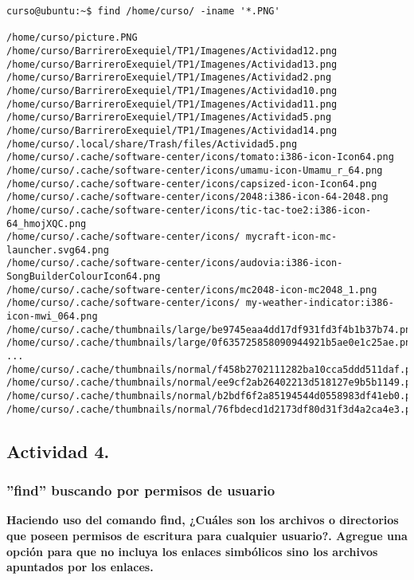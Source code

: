 \documentclass[a4paper,11pt,spanish]{article} %
\newenvironment{myscriptlisting}
{\begin{list}{}{\setlength{\leftmargin}{1em}}\item\scriptsize\bfseries}
{\end{list}}
\begin{document}
\begin{myscriptlisting}
 \begin{verbatim}
curso@ubuntu:~$ find /home/curso/ -iname '*.PNG'

/home/curso/picture.PNG
/home/curso/BarrireroExequiel/TP1/Imagenes/Actividad12.png
/home/curso/BarrireroExequiel/TP1/Imagenes/Actividad13.png
/home/curso/BarrireroExequiel/TP1/Imagenes/Actividad2.png
/home/curso/BarrireroExequiel/TP1/Imagenes/Actividad10.png
/home/curso/BarrireroExequiel/TP1/Imagenes/Actividad11.png
/home/curso/BarrireroExequiel/TP1/Imagenes/Actividad5.png
/home/curso/BarrireroExequiel/TP1/Imagenes/Actividad14.png
/home/curso/.local/share/Trash/files/Actividad5.png
/home/curso/.cache/software-center/icons/tomato:i386-icon-Icon64.png
/home/curso/.cache/software-center/icons/umamu-icon-Umamu_r_64.png
/home/curso/.cache/software-center/icons/capsized-icon-Icon64.png
/home/curso/.cache/software-center/icons/2048:i386-icon-64-2048.png
/home/curso/.cache/software-center/icons/tic-tac-toe2:i386-icon-64_hmojXQC.png
/home/curso/.cache/software-center/icons/ mycraft-icon-mc-launcher.svg64.png
/home/curso/.cache/software-center/icons/audovia:i386-icon-SongBuilderColourIcon64.png
/home/curso/.cache/software-center/icons/mc2048-icon-mc2048_1.png
/home/curso/.cache/software-center/icons/ my-weather-indicator:i386-icon-mwi_064.png
/home/curso/.cache/thumbnails/large/be9745eaa4dd17df931fd3f4b1b37b74.png
/home/curso/.cache/thumbnails/large/0f635725858090944921b5ae0e1c25ae.png
...
/home/curso/.cache/thumbnails/normal/f458b2702111282ba10cca5ddd511daf.png
/home/curso/.cache/thumbnails/normal/ee9cf2ab26402213d518127e9b5b1149.png
/home/curso/.cache/thumbnails/normal/b2bdf6f2a85194544d0558983df41eb0.png
/home/curso/.cache/thumbnails/normal/76fbdecd1d2173df80d31f3d4a2ca4e3.png
 \end{verbatim}
\end{myscriptlisting}


\subsection{Actividad 4.}

\subsubsection{''find'' buscando por permisos de usuario}

\textbf{Haciendo uso del comando find, ¿Cuáles son los archivos o directorios que poseen
permisos de escritura para cualquier usuario?. Agregue una opción para que no incluya
los enlaces simbólicos sino los archivos apuntados por los enlaces.}
\end{document}

